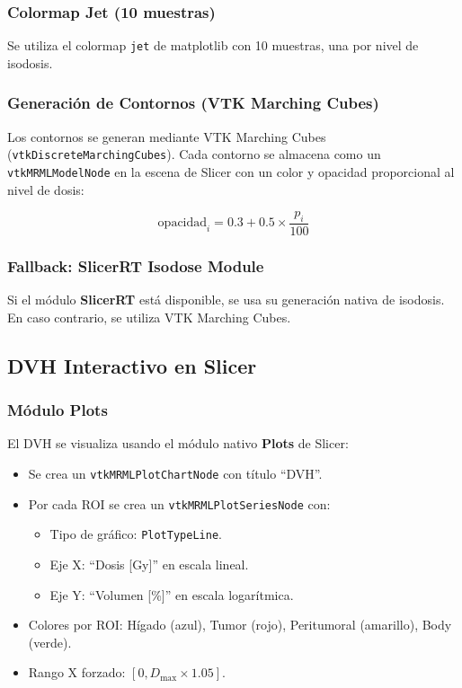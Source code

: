 \documentclass[12pt,a4paper]{article}
\begin{document}
\subsubsection{Colormap Jet (10 muestras)}

Se utiliza el colormap \texttt{jet} de matplotlib con 10 muestras, una por nivel de isodosis.

\subsubsection{Generación de Contornos (VTK Marching Cubes)}

Los contornos se generan mediante VTK Marching Cubes (\texttt{vtkDiscreteMarchingCubes}). Cada contorno se almacena como un \texttt{vtkMRMLModelNode} en la escena de Slicer con un color y opacidad proporcional al nivel de dosis:

$$\text{opacidad}_i = 0.3 + 0.5 \times \frac{p_i}{100}$$

\subsubsection{Fallback: SlicerRT Isodose Module}

Si el módulo \textbf{SlicerRT} está disponible, se usa su generación nativa de isodosis. En caso contrario, se utiliza VTK Marching Cubes.

\subsection{DVH Interactivo en Slicer}

\subsubsection{Módulo Plots}

El DVH se visualiza usando el módulo nativo \textbf{Plots} de Slicer:

\begin{itemize}
  \item Se crea un \texttt{vtkMRMLPlotChartNode} con título ``DVH''.
  \item Por cada ROI se crea un \texttt{vtkMRMLPlotSeriesNode} con:
    \begin{itemize}
      \item Tipo de gráfico: \texttt{PlotTypeLine}.
      \item Eje X: ``Dosis [Gy]'' en escala lineal.
      \item Eje Y: ``Volumen [\%]'' en escala logarítmica.
    \end{itemize}
  \item Colores por ROI: Hígado (azul), Tumor (rojo), Peritumoral (amarillo), Body (verde).
  \item Rango X forzado: $[0, D_{\max} \times 1.05]$.
\end{itemize}
\end{document}
